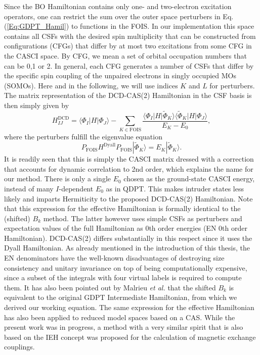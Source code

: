 Since the BO Hamiltonian contains only one- and two-electron excitation operators, one can restrict the sum over the outer space perturbers in Eq. (\ref{Eq:GDPT_Hamil}) to functions in the FOIS. In our implementation this space contains all CSFs with the desired spin multiplicity that can be constructed from configurations (CFGs) that differ by at most two excitations from some CFG in the CASCI space. By CFG, we mean a set of orbital occupation numbers that can be 0,1 or 2. In general, each CFG generates a number of CSFs that differ by the specific spin coupling of the unpaired electrons in singly occupied MOs (SOMOs). Here and in the following, we will use indices $K$ and $L$ for perturbers. The matrix representation of the DCD-CAS(2) Hamiltonian in the CSF basis is then simply given by
          \begin{equation}
          \label{Eq:Heff_DCD}
          H_{IJ}^{{\text{DCD}}} = \langle {{\Phi _I}|H|{\Phi _J}} \rangle  - \sum\limits_{K \in {\text{FOIS}}} {\frac{{\langle {{\Phi _I}|H|{{\tilde \Phi }_K}} \rangle \langle {{{\tilde \Phi }_K}|H|{\Phi _J}} \rangle }}{{{E_K} - {E_0}}}}, 
          \end{equation}	
where the perturbers fulfill the eigenvalue equation
\begin{equation}
\label{Eq:DCD_perturbers}
{P_{{\text{FOIS}}}}{H^{{\text{Dyall}}}}{P_{{\text{FOIS}}}}|{\tilde \Phi _K}\rangle  = E_K^{}|{\tilde \Phi _K}\rangle. 
\end{equation}						
It is readily seen that this is simply the CASCI matrix dressed with a correction that accounts for dynamic correlation to 2nd order, which explains the name for our method. There is only a single $E_0$ chosen as the ground-state CASCI energy, instead of many $I$-dependent $E_0$ as in QDPT. This makes intruder states less likely and imparts Hermiticity to the proposed DCD-CAS(2) Hamiltonian. Note that this expression for the effective Hamiltonian is formally identical to the (shifted) $B_k$ method. The latter however uses simple CSFs as perturbers and expectation values of the full Hamiltonian as 0th order energies (EN 0th order Hamiltonian). DCD-CAS(2) differs substantially in this respect since it uses the Dyall Hamiltonian. As already mentioned in the introduction of this thesis, the EN denominators have the well-known disadvantages of destroying size consistency and unitary invariance on top of being computationally expensive, since a subset of the integrals with four virtual labels is required to compute them. It has also been pointed out by Malrieu \textit{et al.}\cite{MalriNS_1994_1440} that the shifted $B_k$ is equivalent to the original GDPT Intermediate Hamiltonian, from which we derived our working equation. The same expression for the effective Hamiltonian has also been applied to reduced model spaces based on a CAS.\cite{StaroD_1998_435} While the present work was in progress, a method with a very similar spirit that is also based on the IEH concept was proposed for the calculation of magnetic exchange couplings.\cite{TentiMAC_2016_18365}
